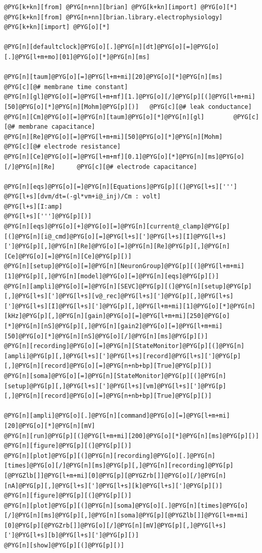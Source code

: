 \documentclass[letterpaper,10pt,english]{manual}
\begin{document}
\begin{Verbatim}[commandchars=@\[\]]
@PYG[k+kn][from] @PYG[n+nn][brian] @PYG[k+kn][import] @PYG[o][*]
@PYG[k+kn][from] @PYG[n+nn][brian.library.electrophysiology] @PYG[k+kn][import] @PYG[o][*]

@PYG[n][defaultclock]@PYG[o][.]@PYG[n][dt]@PYG[o][=]@PYG[o][.]@PYG[l+m+mo][01]@PYG[o][*]@PYG[n][ms]

@PYG[n][taum]@PYG[o][=]@PYG[l+m+mi][20]@PYG[o][*]@PYG[n][ms]        @PYG[c][@# membrane time constant]
@PYG[n][gl]@PYG[o][=]@PYG[l+m+mf][1.]@PYG[o][/]@PYG[p][(]@PYG[l+m+mi][50]@PYG[o][*]@PYG[n][Mohm]@PYG[p][)]   @PYG[c][@# leak conductance]
@PYG[n][Cm]@PYG[o][=]@PYG[n][taum]@PYG[o][*]@PYG[n][gl]        @PYG[c][@# membrane capacitance]
@PYG[n][Re]@PYG[o][=]@PYG[l+m+mi][50]@PYG[o][*]@PYG[n][Mohm]        @PYG[c][@# electrode resistance]
@PYG[n][Ce]@PYG[o][=]@PYG[l+m+mf][0.1]@PYG[o][*]@PYG[n][ms]@PYG[o][/]@PYG[n][Re]      @PYG[c][@# electrode capacitance]

@PYG[n][eqs]@PYG[o][=]@PYG[n][Equations]@PYG[p][(]@PYG[l+s][''']
@PYG[l+s][dvm/dt=(-gl*vm+i@_inj)/Cm : volt]
@PYG[l+s][I:amp]
@PYG[l+s][''']@PYG[p][)]
@PYG[n][eqs]@PYG[o][+]@PYG[o][=]@PYG[n][current@_clamp]@PYG[p][(]@PYG[n][i@_cmd]@PYG[o][=]@PYG[l+s][']@PYG[l+s][I]@PYG[l+s][']@PYG[p][,]@PYG[n][Re]@PYG[o][=]@PYG[n][Re]@PYG[p][,]@PYG[n][Ce]@PYG[o][=]@PYG[n][Ce]@PYG[p][)]
@PYG[n][setup]@PYG[o][=]@PYG[n][NeuronGroup]@PYG[p][(]@PYG[l+m+mi][1]@PYG[p][,]@PYG[n][model]@PYG[o][=]@PYG[n][eqs]@PYG[p][)]
@PYG[n][ampli]@PYG[o][=]@PYG[n][SEVC]@PYG[p][(]@PYG[n][setup]@PYG[p][,]@PYG[l+s][']@PYG[l+s][v@_rec]@PYG[l+s][']@PYG[p][,]@PYG[l+s][']@PYG[l+s][I]@PYG[l+s][']@PYG[p][,]@PYG[l+m+mi][1]@PYG[o][*]@PYG[n][kHz]@PYG[p][,]@PYG[n][gain]@PYG[o][=]@PYG[l+m+mi][250]@PYG[o][*]@PYG[n][nS]@PYG[p][,]@PYG[n][gain2]@PYG[o][=]@PYG[l+m+mi][50]@PYG[o][*]@PYG[n][nS]@PYG[o][/]@PYG[n][ms]@PYG[p][)]
@PYG[n][recording]@PYG[o][=]@PYG[n][StateMonitor]@PYG[p][(]@PYG[n][ampli]@PYG[p][,]@PYG[l+s][']@PYG[l+s][record]@PYG[l+s][']@PYG[p][,]@PYG[n][record]@PYG[o][=]@PYG[n+nb+bp][True]@PYG[p][)]
@PYG[n][soma]@PYG[o][=]@PYG[n][StateMonitor]@PYG[p][(]@PYG[n][setup]@PYG[p][,]@PYG[l+s][']@PYG[l+s][vm]@PYG[l+s][']@PYG[p][,]@PYG[n][record]@PYG[o][=]@PYG[n+nb+bp][True]@PYG[p][)]

@PYG[n][ampli]@PYG[o][.]@PYG[n][command]@PYG[o][=]@PYG[l+m+mi][20]@PYG[o][*]@PYG[n][mV]
@PYG[n][run]@PYG[p][(]@PYG[l+m+mi][200]@PYG[o][*]@PYG[n][ms]@PYG[p][)]
@PYG[n][figure]@PYG[p][(]@PYG[p][)]
@PYG[n][plot]@PYG[p][(]@PYG[n][recording]@PYG[o][.]@PYG[n][times]@PYG[o][/]@PYG[n][ms]@PYG[p][,]@PYG[n][recording]@PYG[p][@PYGZlb[]]@PYG[l+m+mi][0]@PYG[p][@PYGZrb[]]@PYG[o][/]@PYG[n][nA]@PYG[p][,]@PYG[l+s][']@PYG[l+s][k]@PYG[l+s][']@PYG[p][)]
@PYG[n][figure]@PYG[p][(]@PYG[p][)]
@PYG[n][plot]@PYG[p][(]@PYG[n][soma]@PYG[o][.]@PYG[n][times]@PYG[o][/]@PYG[n][ms]@PYG[p][,]@PYG[n][soma]@PYG[p][@PYGZlb[]]@PYG[l+m+mi][0]@PYG[p][@PYGZrb[]]@PYG[o][/]@PYG[n][mV]@PYG[p][,]@PYG[l+s][']@PYG[l+s][b]@PYG[l+s][']@PYG[p][)]
@PYG[n][show]@PYG[p][(]@PYG[p][)]
\end{Verbatim}
\end{document}
